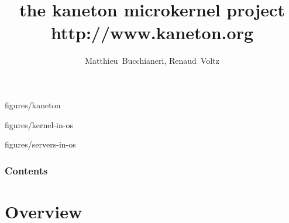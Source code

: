 %
%
%
%
%
%

%
%

\def\path{../../..}

%
%



%
%

\title{the kaneton microkernel project\\http://www.kaneton.org}

%
%

\author
{
  Matthieu~Bucchianeri,
  Renaud~Voltz
}

%
%


		{figures/kaneton}

		{figures/kernel-in-os}

		{figures/servers-in-os}

%
%



%
%

\begin{frame}
  \titlepage

  \begin{center}
    \logos
  \end{center}
\end{frame}

%
%

\begin{frame}
  \frametitle{Contents}
  \tableofcontents
\end{frame}

%
%

\section{Overview}

